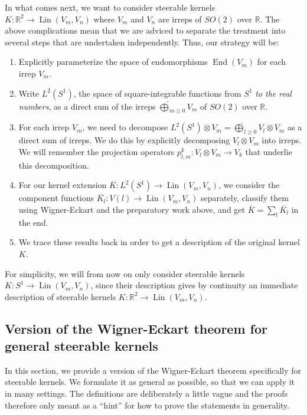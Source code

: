 \documentclass[12pt, a4paper]{article}
\theoremstyle{plain}
\theoremstyle{definition}
\theoremstyle{remark}
\newcommand{\R}{\mathds{R}}
\DeclareMathOperator{\lin}{Lin}
\DeclareMathOperator{\End}{End}
\begin{document}
In what comes next, we want to consider steerable kernels $K: \R^2 \to \lin(V_m, V_n)$ where $V_m$ and $V_n$ are irreps of $SO(2)$ over $\R$. The above complications mean that we are adviced to separate the treatment into several steps that are undertaken independently. Thus, our strategy will be:

\begin{enumerate}
\item Explicitly parameterize the space of endomorphisms $\End(V_m)$ for each irrep $V_m$.
\item Write $L^2(S^1)$, the space of square-integrable functions from $S^1$ \emph{to the real numbers}, as a direct sum of the irreps $\widehat{\bigoplus}_{m \geq 0} V_m$ of $SO(2)$ over $\R$.
\item For each irrep $V_m$, we need to decompose $L^2(S^1) \otimes V_m = \widehat{\bigoplus}_{l \geq 0} V_{l} \otimes V_m$ as a direct sum of irreps. We do this by explicitly decomposing $V_{l} \otimes V_m$ into irreps. We will remember the projection operators $p_{l,m}^k: V_{l} \otimes V_m \to V_k$ that underlie this decomposition.
\item For our kernel extension $\overline{K}: L^2(S^1) \to \lin(V_m, V_n)$, we consider the component functions $\overline{K_l}: V(l) \to \lin(V_m, V_n)$ separately, classify them using Wigner-Eckart and the preparatory work above, and get $\overline{K} = \sum_{l}\overline{K_l}$ in the end.
\item We trace these results back in order to get a description of the original kernel $K$.
\end{enumerate}

For simplicity, we will from now on only consider steerable kernels $K: S^1 \to \lin(V_m, V_n)$, since their description gives by continuity an immediate description of steerable kernels $K: \R^2 \to \lin(V_m, V_n)$.

\subsection{Version of the Wigner-Eckart theorem for general steerable kernels}

In this section, we provide a version of the Wigner-Eckart theorem specifically for steerable kernels. We formulate it as general as possible, so that we can apply it in many settings. The definitions are deliberately a little vague and the proofs therefore only meant as a ``hint'' for how to prove the statements in generality. 
\end{document}
